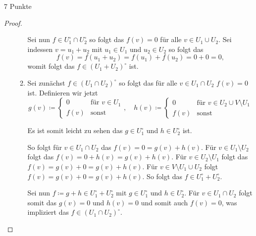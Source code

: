 \documentclass{problemset}
\begin{document}
\begin{problem}{7 Punkte}
\begin{proof}
\begin{enumerate}
\begin{enumerate}
                        Sei nun \(f \in U_1^\circ \cap U_2^\circ\) so folgt das
                        \(f(v) = 0\) für alle \(v \in U_1 \cup U_2\). Sei
                        indessen \(v = u_1 + u_2\) mit \(u_1 \in U_1\) und
                        \(u_2 \in U_2\) so folgt das
                        \begin{equation}
                            f(v) = f(u_1 + u_2) = f(u_1) + f(u_2) = 0 + 0 = 0,
                        \end{equation} womit folgt das \(f \in (U_1 + U_2)^\circ\) ist.

                  \item Sei zunächst \(f \in (U_1 \cap U_2)^\circ\) so folgt
                        das für alle \(v \in U_1 \cap U_2\) \(f(v) = 0\) ist.
                        Definieren wir jetzt
                        \begin{equation*}
                            g(v) \coloneq \left\{\begin{array}{lr}
                                0    & \text{für } v \in U_1 \\
                                f(v) & \text{sonst}
                            \end{array}\right., \quad
                            h(v) \coloneq \left\{\begin{array}{lr}
                                0    & \text{für } v \in U_2 \cup V \setminus U_1 \\
                                f(v) & \text{sonst}
                            \end{array}\right.
                        \end{equation*}

                        Es ist somit leicht zu sehen das \(g \in U_1^\circ\)
                        und \(h \in U_2^\circ\) ist.

                        So folgt für \(v \in U_1 \cap U_2\) das \(f(v) = 0 =
                        g(v) + h(v)\). Für \(v \in U_1 \setminus U_2\) folgt
                        das \(f(v) = 0 + h(v) = g(v) + h(v)\). Für \(v \in U_2
                        \setminus U_1\) folgt das \(f(v) = g(v) + 0 = g(v) +
                        h(v)\). Für \(v \in V \setminus U_1 \cup U_2\) folgt
                        \(f(v) = g(v) + 0 = g(v) + h(v)\). So folgt das \(f \in
                        U_1^\circ + U_2^\circ\).

                        Sei nun \(f \coloneq g + h \in U_1^\circ + U_2^\circ\)
                        mit \(g \in U_1^\circ\) und \(h \in U_2^\circ\). Für
                        \(v \in U_1 \cap U_2\) folgt somit das \(g(v) = 0\) und
                        \(h(v) = 0\) und somit auch \(f(v) = 0\), was
                        impliziert das \(f \in (U_1 \cap U_2)^\circ\).


\end{enumerate}
\end{enumerate}
\end{proof}
\end{problem}
\end{document}
